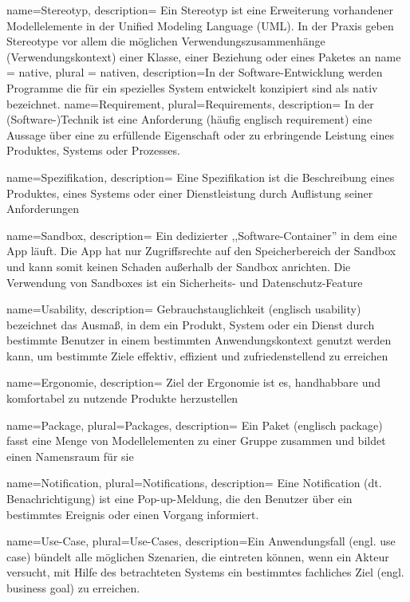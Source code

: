 {
  name=Stereotyp,
  description={
    Ein Stereotyp ist eine Erweiterung vorhandener Modellelemente in der Unified Modeling Language (UML). In der Praxis geben Stereotype vor allem die möglichen Verwendungszusammenhänge (Verwendungskontext) einer Klasse, einer Beziehung oder eines Paketes an}
}
{
name = native,
plural = nativen,
description={In der Software-Entwicklung werden Programme die für ein spezielles System entwickelt konzipiert sind als nativ bezeichnet.
}
}
 {
name=Requirement,
plural=Requirements,
description={
In der (Software-)Technik ist eine Anforderung (häufig englisch requirement) eine Aussage über eine zu erfüllende Eigenschaft oder zu erbringende Leistung eines Produktes, Systems oder Prozesses.}
}

{
  name=Spezifikation,
  description={
    Eine Spezifikation ist die Beschreibung eines Produktes, eines Systems oder einer Dienstleistung durch Auflistung seiner Anforderungen}
}

{
  name=Sandbox,
  description={
    Ein dedizierter ,,Software-Container'' in dem eine App läuft. Die App hat nur Zugriffsrechte auf den Speicherbereich der Sandbox und kann somit keinen Schaden außerhalb der Sandbox anrichten. Die Verwendung von Sandboxes ist ein Sicherheits- und Datenschutz-Feature}
}

{
name=Usability,
description={
  Gebrauchstauglichkeit (englisch usability) bezeichnet das Ausmaß, in dem ein Produkt, System oder ein Dienst durch bestimmte Benutzer in einem bestimmten Anwendungskontext genutzt werden kann, um bestimmte Ziele effektiv, effizient und zufriedenstellend zu erreichen}
}

 {
name=Ergonomie,
description={
  Ziel der Ergonomie ist es, handhabbare und komfortabel zu nutzende Produkte herzustellen}
}

 {
name=Package,
plural=Packages,
description={
Ein Paket (englisch package) fasst eine Menge von Modellelementen zu einer Gruppe zusammen und bildet einen Namensraum für sie}
}

 {
name=Notification,
plural=Notifications,
description={
Eine Notification (dt. Benachrichtigung) ist eine Pop-up-Meldung, die den Benutzer über ein bestimmtes Ereignis oder einen Vorgang informiert.
}
}

 {
name=Use-Case,
plural=Use-Cases,
description={Ein Anwendungsfall (engl. use case) bündelt alle möglichen Szenarien, die eintreten können, wenn ein Akteur versucht,
mit Hilfe des betrachteten Systems ein bestimmtes fachliches Ziel (engl. business goal) zu erreichen.}
}
